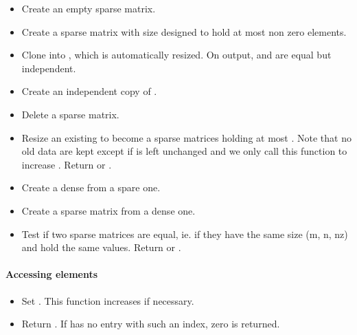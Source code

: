 \begin{itemize}
\item {}
  \sshortdescribe Create an empty sparse matrix.
\item {}
  \sshortdescribe Create a sparse matrix with size  designed to
  hold at most  non zero elements.
\item {}
  \sshortdescribe Clone  into , which is automatically
  resized. On output,  and  are equal but independent.
\item {}
  \sshortdescribe Create an independent copy of .
\item {}
  \sshortdescribe Delete a sparse matrix.
\item {}
  \sshortdescribe Resize an existing \PnlSpMat to become a  sparse
  matrices holding at most . Note that no old data are kept except if
   is left unchanged and we only call this function to increase
  . Return  or .
\item {}
  \sshortdescribe Create a dense \PnlMat from a spare one.
\item {}
\sshortdescribe Create a sparse matrix from a dense one.
\item {}
\sshortdescribe Test if two sparse matrices are equal, ie. if they have the
same size (m, n, nz) and hold the same values. Return  or .
\end{itemize}

\paragraph{Accessing elements}

\begin{itemize}
\item {}
  \sshortdescribe Set . This function increases 
  if necessary.
\item {}
  \sshortdescribe Return . If  has no entry with such an
  index, zero is returned.
\end{itemize}

